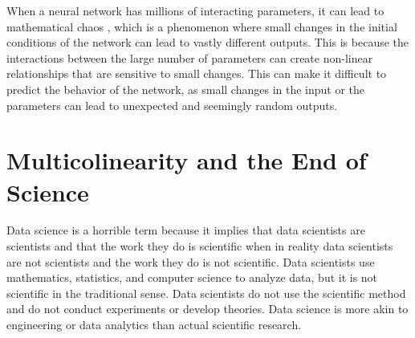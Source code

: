 When a neural network has millions of interacting parameters, it can lead to mathematical chaos , which is a phenomenon where small changes in the initial conditions of the network can lead to vastly different outputs. This is because the interactions between the large number of parameters can create non-linear relationships that are sensitive to small changes. This can make it difficult to predict the behavior of the network, as small changes in the input or the parameters can lead to unexpected and seemingly random outputs.

\section{Multicolinearity and the End of Science}

Data science is a horrible term because it implies that data scientists are scientists and that the work they do is scientific when in reality data scientists are not scientists and the work they do is not scientific. Data scientists use mathematics, statistics, and computer science to analyze data, but it is not scientific in the traditional sense. Data scientists do not use the scientific method and do not conduct experiments or develop theories. Data science is more akin to engineering or data analytics than actual scientific research.

